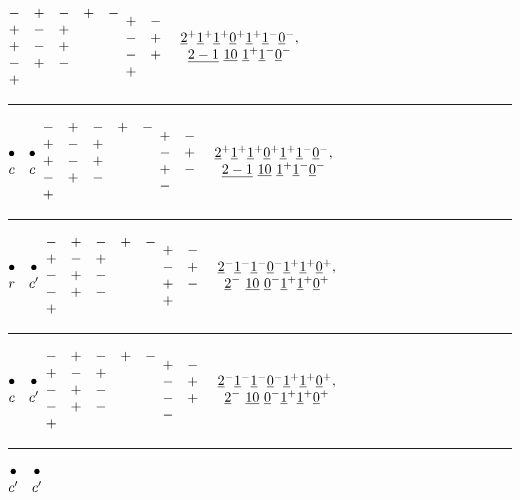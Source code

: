 \documentclass[11pt ,reqno]{amsart}
\begin{document}
$\mat -&+&-&+&-\\ +&-&+&&\\+&-&+&&\\-&+&-&&\\+&&&&\emat$
\qquad $\mat +&-\\-&+\\-&+\\+&&\emat$
\qquad 
\qquad $\mat\ul{2}^+\ul{1}^+\ul{1}^+\ul{0}^+\ul{1}^+\ul{1}^-\ul{0}^-,\\
\ul{2-1}\ \ul{10}\ \ul{1}^+\ul{1}^-\ul{0}^-\emat$
\hfill
\medskip
\hrule
\medskip
$\mat \bullet&\bullet\\ c&c\emat$\qquad  
$\mat -&+&-&+&-\\ +&-&+&&\\+&-&+&&\\-&+&-&&\\+&&&&\emat$
\qquad $\mat +&-\\-&+\\+&-\\-&&\emat$
\qquad 
\qquad $\mat\ul{2}^+\ul{1}^+\ul{1}^+\ul{0}^+\ul{1}^+\ul{1}^-\ul{0}^-,\\
\ul{2-1}\ \ul{10}\ \ul{1}^+\ul{1}^-\ul{0}^-\emat$
\hfill
\medskip
\hrule
\medskip
$\mat \bullet&\bullet\\ r&c'\emat$\qquad  
$\mat -&+&-&+&-\\ +&-&+&&\\-&+&-&&\\-&+&-&&\\+&&&&\emat$
\qquad $\mat +&-\\-&+\\+&-\\+&&\emat$
\qquad 
\qquad $\mat\ul{2}^-\ul{1}^-\ul{1}^-\ul{0}^-\ul{1}^+\ul{1}^+\ul{0}^+,\\
\ul{2}^-\ \ul{10}\ \ul{0}^-\ul{1}^+\ul{1}^+\ul{0}^+\emat$
\hfill
\medskip
\hrule
\medskip
$\mat \bullet&\bullet\\ c&c'\emat$\qquad  
$\mat -&+&-&+&-\\ +&-&+&&\\-&+&-&&\\-&+&-&&\\+&&&&\emat$
\qquad $\mat +&-\\-&+\\-&+\\-&&\emat$
\qquad 
\qquad $\mat\ul{2}^-\ul{1}^-\ul{1}^-\ul{0}^-\ul{1}^+\ul{1}^+\ul{0}^+,\\
\ul{2}^-\ \ul{10}\ \ul{0}^-\ul{1}^+\ul{1}^+\ul{0}^+\emat$
\hfill
\medskip
\hrule
\medskip
$\mat \bullet&\bullet\\ c'&c'\emat$\qquad  
\end{document}
